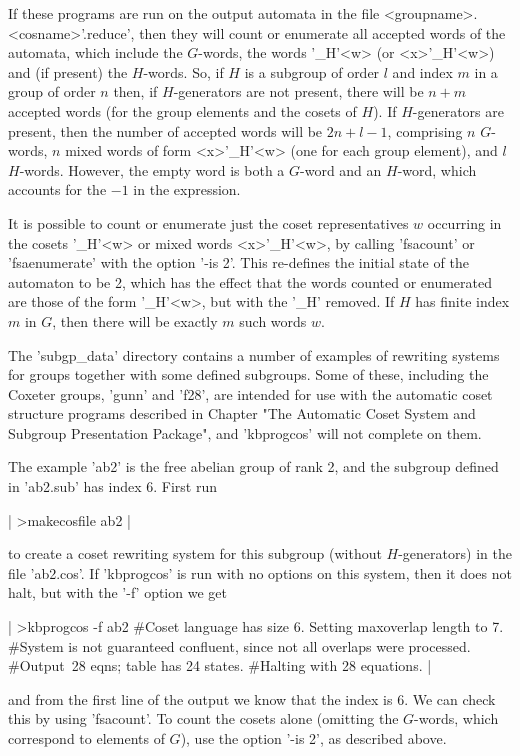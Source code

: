 If these programs are run on the output automata in the file
<groupname>.<cosname>'.reduce', then they will count or enumerate all
accepted words of the automata, which include the $G$-words, the
words '\_H'<w> (or <x>'\_H'<w>) and (if present) the $H$-words.
So, if $H$ is a subgroup of order $l$ and index $m$ in a group
of order $n$ then, if $H$-generators are not present, there will be
$n+m$ accepted words (for the group elements and the cosets of $H$).
If $H$-generators are present, then the number of accepted words will
be $2n+l-1$, comprising $n$ $G$-words, $n$ mixed words of form <x>'\_H'<w>
(one for each group element), and $l$ $H$-words. However, the empty word
is both a $G$-word and an $H$-word, which accounts for the $-1$ in the
expression. 

It is possible to count or enumerate just the coset representatives
$w$ occurring in the cosets '\_H'<w> or mixed words  <x>'\_H'<w>, by
calling 'fsacount' or 'fsaenumerate' with the option '-is 2'.
This re-defines the initial state of the automaton to be 2, which has
the effect that the words counted or enumerated are those of the
form '\_H'<w>, but with the '\_H' removed. If $H$ has finite index
$m$ in $G$, then there will be exactly $m$ such words $w$.


The 'subgp\_data' directory contains a number of examples of rewriting
systems for groups together with some defined subgroups. Some of these,
including the Coxeter groups, 'gunn' and 'f28', are intended for use with
the automatic coset structure programs described in Chapter
"The Automatic Coset System and Subgroup Presentation Package",
and 'kbprogcos' will not complete on them.

The example 'ab2' is the free abelian group of rank 2, and the subgroup
defined in 'ab2.sub' has index 6. First run

|
 >makecosfile ab2
|

to create a coset rewriting system for this subgroup (without $H$-generators)
in the file 'ab2.cos'. If 'kbprogcos' is run with no options on this system,
then it does not halt, but with the '-f' option we get\:

|
 >kbprogcos  -f ab2
#Coset language has size 6. Setting maxoverlap length to 7.
#System is not guaranteed confluent, since not all overlaps were processed.
#Output\:\ 28 eqns; table has 24 states.
#Halting with 28 equations.
|

and from the first line of the output we know that the index is 6.
We can check this by using 'fsacount'. To count the cosets alone
(omitting the $G$-words, which correspond to  elements of $G$), use
the option '-is 2', as described above.

